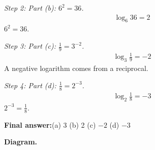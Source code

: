 \documentclass[11pt]{article}
\begin{document}
\textit{Step 2: Part (b): \( 6^2 = 36 \).}
\[\begin{gathered}
\log_6 36 = 2
\end{gathered}\]
\( 6^2 = 36 \).

\textit{Step 3: Part (c): \( \frac{1}{9} = 3^{-2} \).}
\[\begin{gathered}
\log_3 \frac{1}{9} = -2
\end{gathered}\]
A negative logarithm comes from a reciprocal.

\textit{Step 4: Part (d): \( \frac{1}{8} = 2^{-3} \).}
\[\begin{gathered}
\log_2 \frac{1}{8} = -3
\end{gathered}\]
\( 2^{-3} = \frac{1}{8} \).

\begin{answerbox}
\textbf{Final answer:}\quad (a) 3 \quad  (b) 2 \quad  (c) \(\displaystyle  -2 \) \quad  (d) \(\displaystyle  -3 \)
\end{answerbox}
\textbf{Diagram.}
\end{document}
